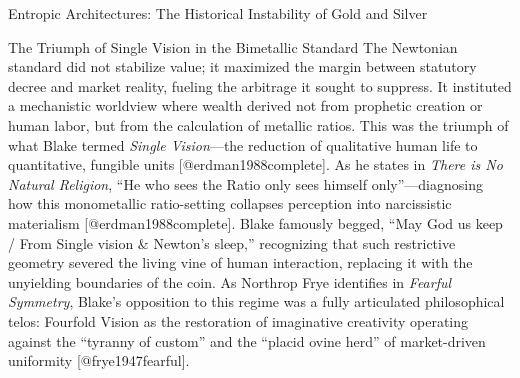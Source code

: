 \documentclass[
  ignorenonframetext,
]{beamer}
\begin{document}
\begin{frame}{Entropic Architectures: The Historical Instability of Gold
and Silver}
\begin{block}{The Triumph of Single Vision in the Bimetallic Standard}
\protect{}\label{the-triumph-of-single-vision-in-the-bimetallic-standard}
The Newtonian standard did not stabilize value; it maximized the margin
between statutory decree and market reality, fueling the arbitrage it
sought to suppress. It instituted a mechanistic worldview where wealth
derived not from prophetic creation or human labor, but from the
calculation of metallic ratios. This was the triumph of what Blake
termed \emph{Single Vision}---the reduction of qualitative human life to
quantitative, fungible units {[}@erdman1988complete{]}. As he states in
\emph{There is No Natural Religion}, ``He who sees the Ratio only sees
himself only''---diagnosing how this monometallic ratio-setting
collapses perception into narcissistic materialism
{[}@erdman1988complete{]}. Blake famously begged, ``May God us keep /
From Single vision \& Newton's sleep,'' recognizing that such
restrictive geometry severed the living vine of human interaction,
replacing it with the unyielding boundaries of the coin. As Northrop
Frye identifies in \emph{Fearful Symmetry}, Blake's opposition to this
regime was a fully articulated philosophical telos: Fourfold Vision as
the restoration of imaginative creativity operating against the
``tyranny of custom'' and the ``placid ovine herd'' of market-driven
uniformity {[}@frye1947fearful{]}.
\end{block}
\end{frame}
\end{document}
